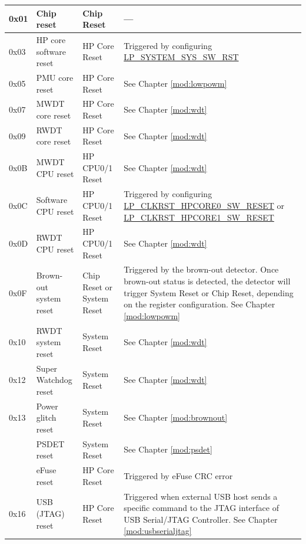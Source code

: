 \documentclass[main\_\_EN.tex]{subfiles}
\begin{document}
\begin{longtable}[c]{ |l|m{3.5cm}|m{2.7cm}|m{8.7cm}| }
    \endlastfoot
        0x01 & Chip reset\tnote{1} & Chip Reset & ---\\
        \hline
        0x03 & HP core software reset & HP Core Reset & Triggered by configuring \hyperref[fielddesc:LPSYSTEMSYSSWRST]{LP\_SYSTEM\_SYS\_SW\_RST} \\\hline
        0x05 & PMU core reset & HP Core Reset & See Chapter \ref{mod:lowpowm} \textit{\nameref{mod:lowpowm}} \\
        \hline
        0x07 & MWDT core reset\tnote{2} & HP Core Reset & See Chapter \ref{mod:wdt} \textit{\nameref{mod:wdt}} \\\hline
        0x09 & RWDT core reset & HP Core Reset & See Chapter \ref{mod:wdt} \textit{\nameref{mod:wdt}} \\\hline
        0x0B & MWDT CPU reset & HP CPU0/1 Reset & See Chapter \ref{mod:wdt} \textit{\nameref{mod:wdt}} \\\hline
        0x0C & Software CPU reset & HP CPU0/1 Reset & Triggered by configuring \hyperref[fielddesc:LPCLKRSTHPCORE0SWRESET]{LP\_CLKRST\_HPCORE0\_SW\_RESET} or \hyperref[fielddesc:LPCLKRSTHPCORE1SWRESET]{LP\_CLKRST\_HPCORE1\_SW\_RESET} \\\hline
        0x0D & RWDT CPU reset & HP CPU0/1 Reset & See Chapter \ref{mod:wdt} \textit{\nameref{mod:wdt}} \\\hline
        0x0F & Brown-out system reset & Chip Reset or System Reset & Triggered by the brown-out detector. Once brown-out status is detected, the detector will trigger System Reset or Chip Reset, depending on the register configuration. See Chapter \ref{mod:lowpowm} \textit{\nameref{mod:lowpowm}}\\\hline
        0x10 & RWDT system reset & System Reset & See Chapter \ref{mod:wdt} \textit{\nameref{mod:wdt}} \\\hline
        0x12 & Super Watchdog reset & System Reset & See Chapter \ref{mod:wdt} \textit{\nameref{mod:wdt}} \\\hline
        0x13 & Power glitch reset & System Reset & See Chapter \ref{mod:brownout} \textit{\nameref{mod:brownout}}
        \\\hline
        \tagged{ESP32-P4-latest}{0x1B & PSDET reset & System Reset & See Chapter \ref{mod:psdet} \textit{\nameref{mod:psdet}}\\\hline}
        0x14 & eFuse reset & HP Core Reset & Triggered by eFuse CRC error \\\hline
        0x16 & USB (JTAG) reset & HP Core Reset & Triggered when external USB host sends a specific command to the JTAG interface of USB Serial/JTAG Controller. See Chapter \ref{mod:usbserialjtag} \textit{\nameref{mod:usbserialjtag}} \\\hline

\end{longtable}
\end{document}
